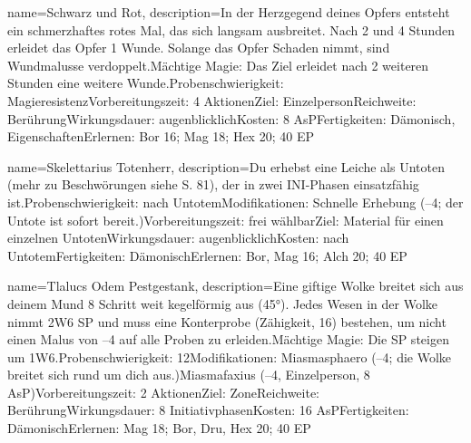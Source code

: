 {
    name={Schwarz und Rot},
    description={In der Herzgegend deines Opfers entsteht ein schmerzhaftes rotes Mal, das sich langsam ausbreitet. Nach 2 und 4 Stunden erleidet das Opfer 1 Wunde. Solange das Opfer Schaden nimmt, sind Wundmalusse verdoppelt.\newline Mächtige Magie: Das Ziel erleidet nach 2 weiteren Stunden eine weitere Wunde.\newline Probenschwierigkeit: Magieresistenz\newline Vorbereitungszeit: 4 Aktionen\newline Ziel: Einzelperson\newline Reichweite: Berührung\newline Wirkungsdauer: augenblicklich\newline Kosten: 8 AsP\newline Fertigkeiten: Dämonisch, Eigenschaften\newline Erlernen: Bor 16; Mag 18; Hex 20; 40 EP}
}


{
    name={Skelettarius Totenherr},
    description={Du erhebst eine Leiche als Untoten (mehr zu Beschwörungen siehe S. 81), der in zwei INI-Phasen einsatzfähig ist.\newline Probenschwierigkeit: nach Untotem\newline Modifikationen: Schnelle Erhebung (–4; der Untote ist sofort bereit.)\newline Vorbereitungszeit: frei wählbar\newline Ziel: Material für einen einzelnen Untoten\newline Wirkungsdauer: augenblicklich\newline Kosten: nach Untotem\newline Fertigkeiten: Dämonisch\newline Erlernen: Bor, Mag 16; Alch 20; 40 EP}
}


{
    name={Tlalucs Odem Pestgestank},
    description={Eine giftige Wolke breitet sich aus deinem Mund 8 Schritt weit kegelförmig aus (45°). Jedes Wesen in der Wolke nimmt 2W6 SP und muss eine Konterprobe (Zähigkeit, 16) bestehen, um nicht einen Malus von –4 auf alle Proben zu erleiden.\newline Mächtige Magie: Die SP steigen um 1W6.\newline Probenschwierigkeit: 12\newline Modifikationen: Miasmasphaero (–4; die Wolke breitet sich rund um dich aus.)\newline Miasmafaxius (–4, Einzelperson, 8 AsP)\newline Vorbereitungszeit: 2 Aktionen\newline Ziel: Zone\newline Reichweite: Berührung\newline Wirkungsdauer: 8 Initiativphasen\newline Kosten: 16 AsP\newline Fertigkeiten: Dämonisch\newline Erlernen: Mag 18; Bor, Dru, Hex 20; 40 EP}
}


